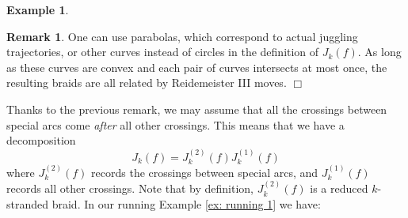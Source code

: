 \documentclass[10pt]{amsart}
\theoremstyle{plain}
\newtheorem{example}[thm]{Example}
\theoremstyle{definition}
\newtheorem{remark}[thm]{Remark}
\theoremstyle{remark}
\numberwithin{equation}{section}
\newcommand{\Ja}{J^{(1)}}
\newcommand{\Jb}{J^{(2)}}
\begin{document}
\begin{example}
\begin{center}
  \end{center}
\end{example}



\begin{remark}
One can use parabolas, which correspond to actual juggling trajectories, or other curves instead of circles in the definition of $J_k(f)$. As long as these curves are convex and each pair of curves intersects at most once, the resulting braids are all related by Reidemeister III moves.
\hfill$\Box$
\end{remark}

Thanks to the previous remark, we may assume that all the crossings between special arcs come \emph{after} all other crossings. This means that we have a decomposition
\[
J_k(f) = \Jb_k(f)\Ja_k(f)
\]
where $\Jb_k(f)$ records the crossings between special arcs, and $\Ja_k(f)$ records all other crossings. Note that by definition, $\Jb_k(f)$ is a reduced $k$-stranded braid. In our running Example \ref{ex: running 1} we have:
\end{document}
